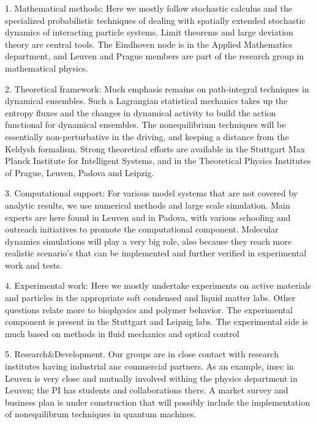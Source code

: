 1. Mathematical methods: Here we mostly follow stochastic calculus and the specialized
probabilistic techniques of dealing with spatially extended stochastic dynamics of
interacting particle systems. Limit theorems and large deviation theory are central tools.
The Eindhoven node is in the Applied Mathematics department, and Leuven and Prague members
are part of the research group in mathematical physics.

2. Theoretical framework: Much emphasis remains on path-integral techniques in dynamical
ensembles.  Such a Lagrangian statistical mechanics takes up the entropy fluxes and the
changes in dynamical activity to build the action functional for dynamical ensembles.  The
nonequilibrium techniques will be essentially non-perturbative in the driving, and keeping a
distance from the Keldysh formalism. Strong theoretical efforts are available in the
Stuttgart Max Planck Institute for Intelligent Systems, and in the Theoretical Physics
Institutes of Prague, Leuven, Padova and Leipzig.

3. Computational support: For various model systems that are not covered by analytic results, we use numerical methods and large scale simulation.  Main experts are
here found in Leuven and in Padova, with various schooling and outreach initiatives to
promote the computational component.  Molecular dynamics simulations will play a very big role, also because they reach more realistic scenario's that can be implemented and further verified in experimental work and tests.

4. Experimental work: Here we mostly undertake experiments on active materials and particles
in the appropriate soft condensed and liquid matter labs.  Other questions relate more to
biophysics and polymer behavior. The experimental component is present in the Stuttgart and
Leipzig labs.  The experimental side is much based on methods in fluid mechanics and optical control


5. Research\&Development.  Our groups are in close contact with research institutes having industrial anc commercial partners.
As an example, imec in Leuven is very close and mutually involved withing the physics department in Leuven; the PI has students and collaborations there.
A market survey and business plan is under construction that will possibly include the implementation of nonequilibrum techniques in quantum machines.


